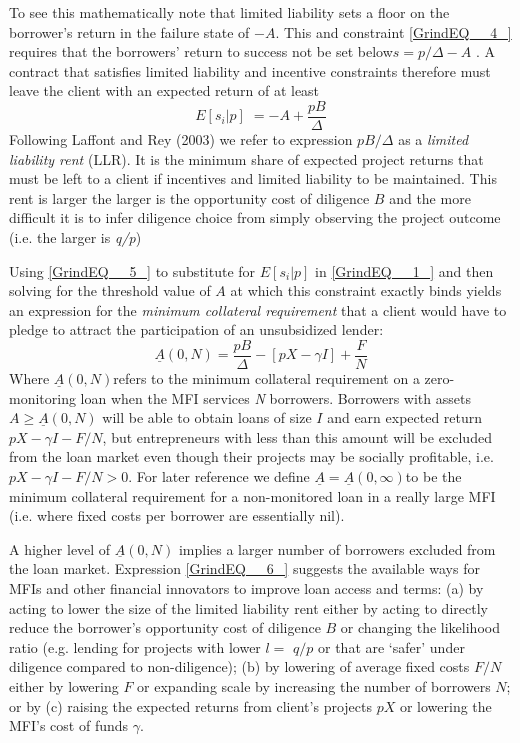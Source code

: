 \documentclass{article} %
\begin{document}
To see this mathematically note that limited liability sets a floor on the borrower's return in the failure state of $-A$.  This and constraint \eqref{GrindEQ__4_} requires that the borrowers' return to success not be set below$s=p/\Delta -A$ . A contract that satisfies limited liability and incentive constraints therefore must leave the client with an expected return of at least
\begin{equation} \label{5)} 
E\left[s_{i} |p\right]\phantom{.} =-A+\frac{pB}{\Delta }  
\end{equation} 
Following Laffont and Rey (2003) we refer to expression $pB/\Delta $ as a \textit{limited liability rent} (LLR).  It is the minimum share of expected project returns that must be left to a client if incentives and limited liability to be maintained.  This rent is larger the larger is the opportunity cost of diligence $B$ and the more difficult it is to infer diligence choice from simply observing the project outcome (i.e. the larger is \textit{q/p}) 

Using \eqref{GrindEQ__5_} to substitute for $E\left[s_{i} |p\right]$ in \eqref{GrindEQ__1_} and then solving for the threshold value of $A$ at which this constraint exactly binds yields an expression for the \textit{minimum collateral requirement }that a client would have to pledge to attract the participation of an unsubsidized lender:
\begin{equation} \label{6)} 
\underline{A}(0,N)=\frac{pB}{\Delta } -\left[pX-\gamma I\right]+\frac{F}{N}  
\end{equation} 
Where $\underline{A}(0,N)$refers to the minimum collateral requirement on a zero-monitoring loan when the MFI services \textit{N} borrowers.  Borrowers with assets $A\ge \underline{A}(0,N)$ will be able to obtain loans of size $I$ and earn expected return$pX-\gamma I-F/N$, but entrepreneurs with less than this amount will be excluded from the loan market even though their projects may be socially profitable, i.e. $pX-\gamma I-F/N>0.$ For later reference we define $\underline{A}=\underline{A}(0,\infty )$to be the minimum collateral requirement for a non-monitored loan in a really large MFI (i.e. where fixed costs per borrower are essentially nil). 

A higher level of $\underline{A}(0,N)$ implies a larger number of borrowers excluded from the loan market.  Expression \eqref{GrindEQ__6_} suggests the available ways for MFIs and other financial innovators to improve loan access and terms: $ $(a) by acting to lower the size of the limited liability rent either by acting to directly reduce the borrower's opportunity cost of diligence $B$ or changing the likelihood ratio (e.g. lending for projects with lower $l=$ $q/p$ or that are `safer' under diligence compared to non-diligence); (b) by lowering of average fixed costs $F/N$ either by lowering $F$ or expanding scale by increasing the number of borrowers $N$; or by (c) raising the expected returns from client's projects $pX$ or lowering the MFI's cost of funds $\gamma $. 
\end{document}
